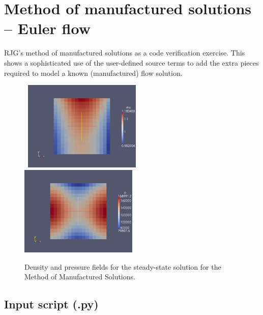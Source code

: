 
\section{Method of manufactured solutions -- Euler flow}
%
RJG's method of manufactured solutions as a code verification exercise.
This shows a sophisticated use of the user-defined source terms to
add the extra pieces required to model a known (manufactured) flow solution.

\begin{figure}[htbp]
\begin{center}
\mbox{
\includegraphics[width=0.5\textwidth]{../2D/mms_euler/mms-density.png}
\includegraphics[width=0.5\textwidth]{../2D/mms_euler/mms-pressure.png}
}
\end{center}
\caption{Density and pressure fields for the steady-state solution for the
  Method of Manufactured Solutions.}
\label{mms-euler-density-pressure-fig}
\end{figure}


\newpage

\subsection{Input script (.py)}
\topbar

\bottombar

